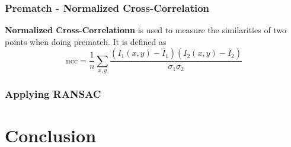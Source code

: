 \documentclass[paper=a4, fontsize=11pt]{scrartcl}
\begin{document}
\subsubsection{Prematch - Normalized Cross-Correlation}

\textbf{Normalized Cross-Correlationn} is used to measure the similarities of two points when doing prematch.
It is defined as 
\begin{equation}
\mbox{ncc} = \frac{1}{n} \sum_{x, y} \frac{(I_{1}(x,y)-\bar{I}_{1})(I_{2}(x,y)-\bar{I}_{2})}{\sigma_{1}\sigma_{2}}
\end{equation}



\subsubsection{Applying RANSAC}



\section{Conclusion}








\end{document}
